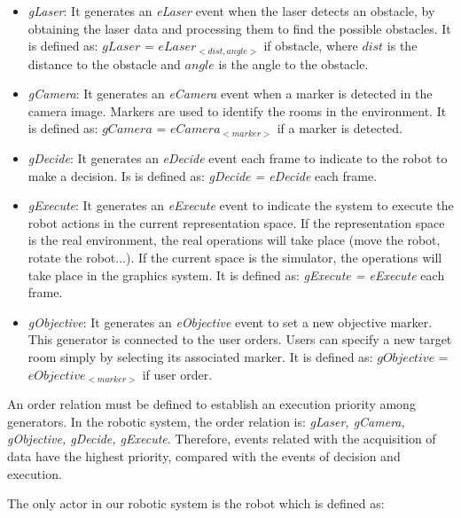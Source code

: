 \documentclass{svmult}
\begin{document}
\begin{itemize}
	\item \textit{gLaser}: It generates an \textit{eLaser} event when the laser detects an obstacle, 
			by obtaining the laser data and processing them to find the possible obstacles.
			It is defined as: 
			$gLaser$ = $eLaser_{<dist,angle>}$  if obstacle, where
			$dist$ is the distance to the obstacle and $angle$ is the angle to the obstacle.
			
	\item \textit{gCamera}: It generates an \textit{eCamera} event when a marker is detected in the camera image. 
			Markers are used to identify the rooms in the environment.
			It is defined as:			
			$gCamera$ = $eCamera_{<marker>}$ if a marker is detected. 
			
	\item \textit{gDecide}: It generates an \textit{eDecide} event each frame to 
			indicate to the robot to make a decision. 
			Is is defined as: 	
			\textit{gDecide = eDecide} each frame.
			
	\item \textit{gExecute}: It generates an \textit{eExecute} event to indicate the system 
			to execute the robot actions in the current representation space. 
			If the representation space is the real environment, 
			the real operations will take place (move the robot, rotate the robot...). 
			If the current space is the simulator, the operations will take place in the graphics system. 
			It is defined as:			
			\textit{gExecute = eExecute} each frame.
			
	\item \textit{gObjective}: It generates an \textit{eObjective} event to set a new objective marker. 
			This generator is connected to the user orders. Users can specify a new target room 
			simply by selecting its associated marker.
			It is defined as: 
			$gObjective$ = $eObjective_{<marker>}$ if user order.

			
\end{itemize}

An order relation must be defined to establish an execution priority among generators. In the robotic system, the order relation is: \textit{gLaser, gCamera, gObjective, gDecide, gExecute}. Therefore, events related with the acquisition of data have the highest priority, compared with the events of decision and execution.




The only actor in our robotic system is the robot which is defined as:
\end{document}
